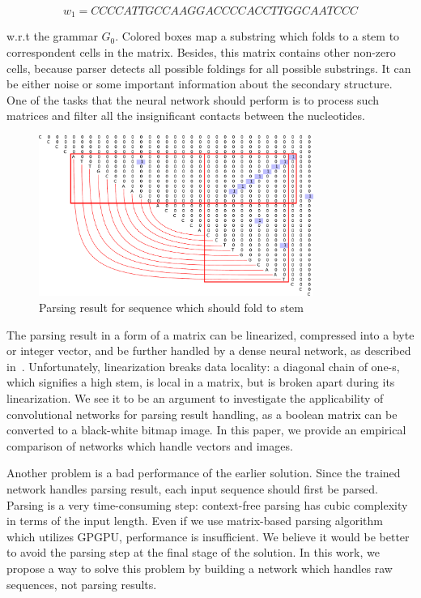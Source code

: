 \[
w_1 = CCCCATTGCCAAGGACCCCACCTTGGCAATCCC
\]

w.r.t the grammar $G_0$.
Colored boxes map a substring which folds to a stem to correspondent cells in the matrix. 
Besides, this matrix contains other non-zero cells, because parser detects all possible foldings for all possible substrings. 
It can be either noise or some important information about the secondary structure. 
One of the tasks that the neural network should perform is to process such matrices and filter all the insignificant contacts between the nucleotides.

\begin{figure}[h]
\begin{center}
\centering
\includegraphics[width=0.8\textwidth]{figures/4.pdf}
\caption{Parsing result for sequence which should fold to
stem}
\label{fig:example}
\end{center}
\end{figure}

The parsing result in a form of a matrix can be linearized, compressed into a byte or integer vector, and be further handled by a dense neural network, as described in~\cite{grigorevcomposition}.
Unfortunately, linearization breaks data locality: a diagonal chain of one-s, which signifies a high stem, is local in a matrix, but is broken apart during its linearization.
We see it to be an argument to investigate the applicability of convolutional networks for parsing result handling, as a boolean matrix can be converted to a black-white bitmap image.
In this paper, we provide an empirical comparison of networks which handle vectors and images.

Another problem is a bad performance of the earlier solution.
Since the trained network handles parsing result, each input sequence should first be parsed.
Parsing is a very time-consuming step: context-free parsing has cubic complexity in terms of the input length.
Even if we use matrix-based parsing algorithm~\cite{Azimov:2018:CPQ:3210259.3210264} which utilizes GPGPU, performance is insufficient.
We believe it would be better to avoid the parsing step at the final stage of the solution.
In this work, we propose a way to solve this problem by building a network which handles raw sequences, not parsing results.
